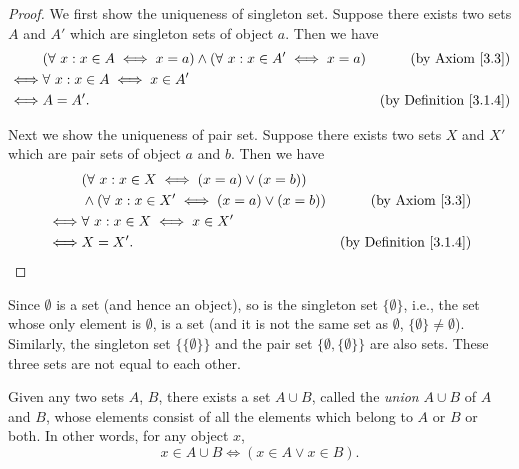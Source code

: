 \begin{proof}
    We first show the uniqueness of singleton set.
    Suppose there exists two sets \(A\) and \(A'\) which are singleton sets of object \(a\).
    Then we have
    \begin{align*}
             & (\forall\ x : x \in A \iff x = a) \land (\forall\ x : x \in A' \iff x = a) & \text{(by Axiom \ref{3.3})}        \\
        \iff & \forall\ x : x \in A \iff x \in A'                                                                              \\
        \iff & A = A'.                                                                    & \text{(by Definition \ref{3.1.4})}
    \end{align*}

    Next we show the uniqueness of pair set.
    Suppose there exists two sets \(X\) and \(X'\) which are pair sets of object \(a\) and \(b\).
    Then we have
    \begin{align*}
             & (\forall\ x : x \in X \iff (x = a) \lor (x = b))                                             \\
             & \land (\forall\ x : x \in X' \iff (x = a) \lor (x = b)) & \text{(by Axiom \ref{3.3})}        \\
        \iff & \forall\ x : x \in X \iff x \in X'                                                           \\
        \iff & X = X'.                                                 & \text{(by Definition \ref{3.1.4})}
    \end{align*}
\end{proof}

\begin{example}\label{3.1.10}
    Since \(\emptyset\) is a set (and hence an object), so is the singleton set \(\{\emptyset\}\), i.e., the set whose only element is \(\emptyset\), is a set (and it is not the same set as \(\emptyset\), \(\{\emptyset\} \neq \emptyset\)).
    Similarly, the singleton set \(\{\{\emptyset\}\}\) and the pair set \(\{\emptyset, \{\emptyset\}\}\) are also sets.
    These three sets are not equal to each other.
\end{example}

\begin{axiom}\label{3.4}
    Given any two sets \(A\), \(B\), there exists a set \(A \cup B\), called the \emph{union} \(A \cup B\) of \(A\) and \(B\), whose elements consist of all the elements which belong to \(A\) or \(B\) or both.
    In other words, for any object \(x\),
    \[
        x \in A \cup B \iff (x \in A \lor x \in B).
    \]
\end{axiom}

